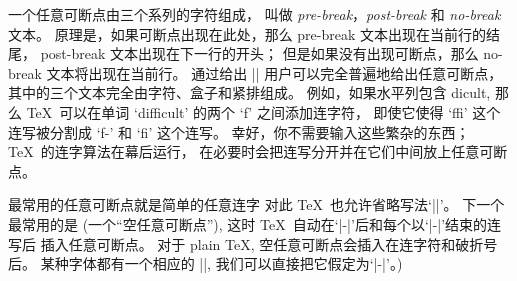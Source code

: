 \danger 一个任意可断点由三个系列的字符组成，
叫做 {\sl pre-break}，{\sl post-break} 和 {\sl no-break\/} 文本。
原理是，如果可断点出现在此处，那么 pre-break 文本出现在当前行的结尾，
post-break 文本出现在下一行的开头；
但是如果没有出现可断点，那么 no-break 文本将出现在当前行。
通过给出
\begindisplay
||
\enddisplay
用户可以完全普遍地给出任意可断点，其中的三个文本完全由字符、盒子和紧排组成。
例如，如果水平列包含
\begintt
dicult,
\endtt
那么 \TeX\ 可以在单词 `difficult' 的两个 `f' 之间添加连字符，
即使它使得 `ffi' 这个连写被分割成 `f-' 和 `fi' 这个连写。
幸好，你不需要输入这些繁杂的东西；\TeX\ 的连字算法在幕后运行，
在必要时会把连写分开并在它们中间放上任意可断点。

\danger 最常用的任意可断点就是简单的任意连字
\begintt
\discretionary{-}{}{}
\endtt
对此 \TeX\ 也允许省略写法`|\-|'。%
下一个最常用的是
\begintt
\discretionary{}{}{}
\endtt
(一个``空任意可断点''), 这时 \TeX\ 自动在`|-|'后和每个以`|-|'结束的连写后%
插入任意可断点。%
对于 plain \TeX, 空任意可断点会插入在连字符和破折号后。%
某种字体都有一个相应的 |\hyphenchar|, 我们可以直接把它假定为`|-|'。)

